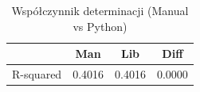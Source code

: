 \begin{table}[H]
\caption{Współczynnik determinacji (Manual vs Python)}
\label{tab:zad2_r2}
\begin{tabular}{lccc}
\toprule
 & Man & Lib & Diff \\
\midrule
R-squared & 0.4016 & 0.4016 & 0.0000 \\
\bottomrule
\end{tabular}
\end{table}
